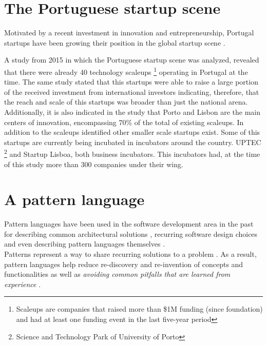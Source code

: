   	\section{The Portuguese startup scene} \label{sec:stateoftheart:sec:portuguesestartupscene}
    Motivated by a recent investment in innovation and entrepreneurship, Portugal startups have been growing their position in the global startup scene \cite{Coleman2015}.

    A study from 2015 \citet{StartupEuropePartnership2015} in which the Portuguese startup scene was analyzed, revealed that there were already 40 technology scaleups \footnote{Scaleups are companies that raised more than \$1M funding (since foundation) and had at least one funding event in the last five-year period } operating in Portugal at the time. The same study stated that this startups were able to raise a large portion of the received investment from international investors indicating, therefore, that the reach and scale of this startups was broader than just the national arena. Additionally, it is also indicated in the study that Porto and Lisbon are the main centers of innovation, encompassing 70\% of the total of existing scaleups. In addition to the scaleups identified other smaller scale startups exist. Some of this startups are currently being incubated in incubators around the country. UPTEC \footnote{Science and Technology Park of University of Porto} and Startup Lisboa, both business incubators. This incubators had, at the time of this study more than 300 companies \cite{Uptec,StartupLisboa} under their wing.


    \section{A pattern language}
    Pattern languages have been used in the software development area in the past for describing common architectural solutions \cite{kircher2013pattern}, recurring software design choices \cite{johnson1995design} and even describing pattern languages themselves \cite{Meszaros1998}.\\
    Patterns represent a way to share recurring solutions to a problem \cite{Meszaros1998}. As a result, pattern languages help reduce re-discovery and re-invention of concepts and functionalities as well as \textit{avoiding common pitfalls that are learned from experience} \cite{Schmidt1995}.

